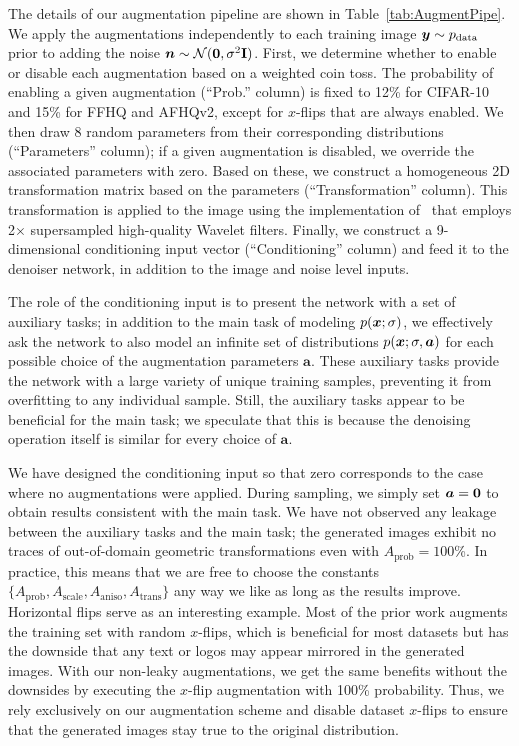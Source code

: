 The details of our augmentation pipeline are shown in Table~\ref{tab:AugmentPipe}.
We apply the augmentations independently to each training image $\boldsymbol{y} \sim p_\text{data}$ prior to adding the noise $\boldsymbol{n} \sim \mathcal{N}(\mathbf{0}, \sigma^2 \mathbf{I})$.
First, we determine whether to enable or disable each augmentation based on a weighted coin toss.
The probability of enabling a given augmentation (``Prob.'' column) is fixed to 12\% for CIFAR-10 and 15\% for FFHQ and AFHQv2, except for $x$-flips that are always enabled.
We then draw 8 random parameters from their corresponding distributions (``Parameters'' column); if a given augmentation is disabled, we override the associated parameters with zero.
Based on these, we construct a homogeneous 2D transformation matrix based on the parameters (``Transformation'' column).
This transformation is applied to the image using the implementation of~\cite{Karras2020ada} that employs 2$\times$ supersampled high-quality Wavelet filters.
Finally, we construct a 9-dimensional conditioning input vector (``Conditioning'' column) and feed it to the denoiser network, in addition to the image and noise level inputs.

\tabAugmentPipe

The role of the conditioning input is to present the network with a set of auxiliary tasks; in addition to the main task of modeling $p(\boldsymbol{x}; \sigma)$, we effectively ask the network to also model an infinite set of distributions $p(\boldsymbol{x}; \sigma, \boldsymbol{a})$ for each possible choice of the augmentation parameters $\boldsymbol{a}$.
These auxiliary tasks provide the network with a large variety of unique training samples, preventing it from overfitting to any individual sample.
Still, the auxiliary tasks appear to be beneficial for the main task; we speculate that this is because the denoising operation itself is similar for every choice of $\boldsymbol{a}$.

We have designed the conditioning input so that zero corresponds to the case where no augmentations were applied.
During sampling, we simply set $\boldsymbol{a} = \mathbf{0}$ to obtain results consistent with the main task.
We have not observed any leakage between the auxiliary tasks and the main task; the generated images exhibit no traces of out-of-domain geometric transformations even with $A_\text{prob} = 100$\%.
In practice, this means that we are free to choose the constants $\{A_\text{prob}, A_\text{scale}, A_\text{aniso}, A_\text{trans}\}$ any way we like as long as the results improve.
Horizontal flips serve as an interesting example.
Most of the prior work augments the training set with random $x$-flips, which is beneficial for most datasets but has the downside that any text or logos may appear mirrored in the generated images.
With our non-leaky augmentations, we get the same benefits without the downsides by executing the $x$-flip augmentation with 100\% probability.
Thus, we rely exclusively on our augmentation scheme and disable dataset $x$-flips to ensure that the generated images stay true to the original distribution.

